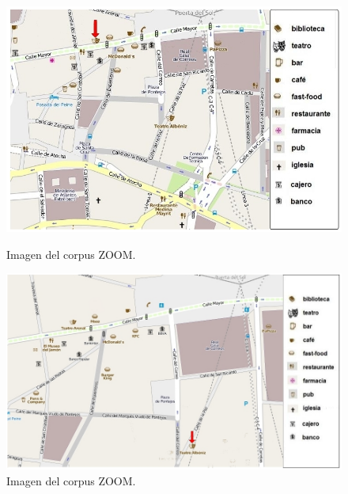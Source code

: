 \begin{figure}
\begin{minipage}[b]{0.48\linewidth}
\centering
\includegraphics[width=\textwidth]{images/corpus/mapa1.png}
\caption{Imagen del corpus ZOOM.}
\label{mapa13}
\end{minipage}
\hspace*{0cm}
\begin{minipage}[b]{0.55\linewidth}
\centering
\includegraphics[width=\textwidth]{images/corpus/mapa2.png}
\caption{Imagen del corpus ZOOM.}
\label{mapa14}
\end{minipage}
\end{figure}

